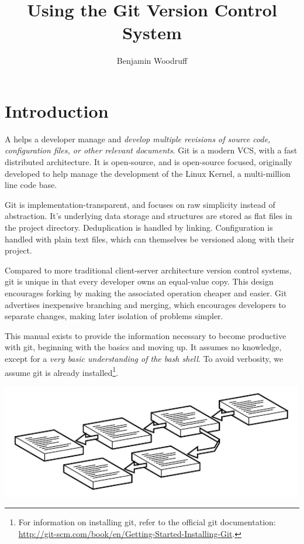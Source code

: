 \documentclass[11pt,letterpaper,twoside]{report}
\title{Using the Git Version Control System}
\author{Benjamin Woodruff}
\begin{document}
\maketitle
\maketoc

\chapter{Introduction}

A  helps a developer manage and
\emph{develop multiple revisions of source code, configuration files, or other
relevant documents}. Git is a modern VCS, with a fast distributed architecture.
It is open-source, and is open-source focused, originally developed to help
manage the development of the Linux Kernel, a multi-million line code base.

Git is implementation-transparent, and focuses on raw simplicity instead of
abstraction. It's underlying data storage and structures are stored as flat
files in the project directory. Deduplication is handled by linking.
Configuration is handled with plain text files, which can themselves be
versioned along with their project.

Compared to more traditional client-server architecture version control systems,
git is unique in that every developer owns an equal-value copy. This design
encourages forking by making the associated operation cheaper and easier. Git
advertises inexpensive branching and merging, which encourages developers to
separate changes, making later isolation of problems simpler.

This manual exists to provide the information necessary to become productive
with git, beginning with the basics and moving up. It assumes no knowledge,
except for a \emph{very basic understanding of the bash shell}. To avoid
verbosity, we assume git is already installed\footnote{For information on
installing git, refer to the official git documentation:
\url{http://git-scm.com/book/en/Getting-Started-Installing-Git}.}.

\vspace{\fill}
\begin{center}
\includegraphics[height=5cm]{resources/branching_abstract.pdf}
\end{center}
\vspace*{\fill}
\end{document}
